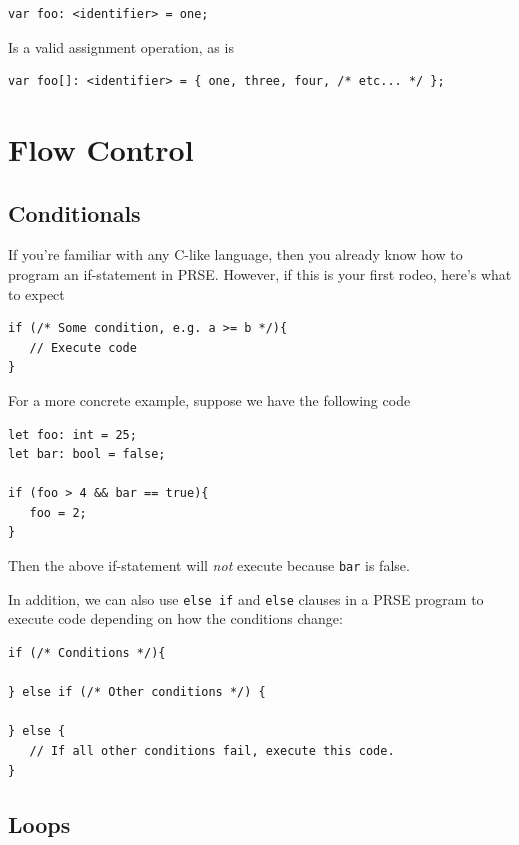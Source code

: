 \documentclass[letterpaper, 12pt]{article}
\begin{document}
\begin{lstlisting}
var foo: <identifier> = one;
\end{lstlisting}

Is a valid assignment operation, as is

\begin{lstlisting}
var foo[]: <identifier> = { one, three, four, /* etc... */ };
\end{lstlisting}

\newpage

\section{Flow Control}

\subsection{Conditionals}

If you're familiar with any C-like language, then you already know how to program an if-statement in
PRSE. However, if this is your first rodeo, here's what to expect

\begin{lstlisting}
if (/* Some condition, e.g. a >= b */){
   // Execute code
}
\end{lstlisting}

For a more concrete example, suppose we have the following code

\begin{lstlisting}
let foo: int = 25;
let bar: bool = false;

if (foo > 4 && bar == true){
   foo = 2;
}
\end{lstlisting}

Then the above if-statement will {\em not} execute because \texttt{bar} is false.\linebreak

In addition, we can also use \texttt{else if} and \texttt{else} clauses in a PRSE program to execute
code depending on how the conditions change:

\begin{lstlisting}
if (/* Conditions */){

} else if (/* Other conditions */) {

} else {
   // If all other conditions fail, execute this code.
}
\end{lstlisting}

\subsection{Loops}
\label{sec:flowcontrol-loops}
\end{document}
